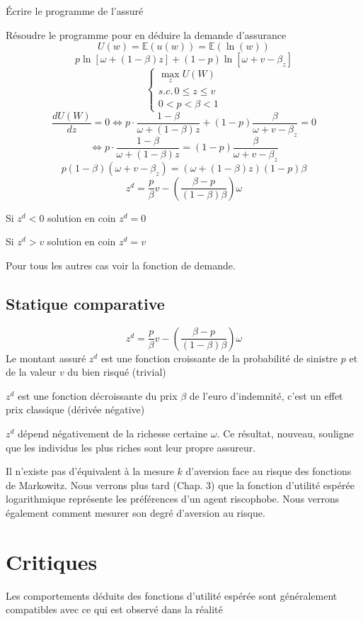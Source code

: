 \documentclass[a4paper, 12pt]{report}
\begin{document}
Écrire le programme de l'assuré

Résoudre le programme pour en déduire la demande
d'assurance
$$
U(w)=\mathbb{E}(u(w))=\mathbb{E}(\ln(w))
$$
$$
p\ln \left[ \omega + (1-\beta)z\right]+(1-p)\ln\left[ \omega + v - \beta_z \right] 
$$
$$
\begin{cases}\underset{z}\max U(W)\\ s.c. \, 0\le z\le v \\ 0 < p < \beta < 1 \end{cases}
$$
$$
\frac{dU(W)}{dz}=0 \Leftrightarrow p \cdot \frac{1-\beta}{\omega + (1-\beta)z}+(1-p)\frac{\beta}{\omega + v - \beta_z}=0
$$
$$
\Leftrightarrow  p \cdot \frac{1-\beta}{\omega + (1-\beta)z} = (1-p)\frac{\beta}{\omega + v - \beta_z}
$$
$$
p(1-\beta)(\omega + v - \beta_z) = (\omega +(1-\beta)z)(1-p)\beta
$$
$$
z^d = \frac{p}{\beta}v-\left( \frac{\beta-p}{(1-\beta)\beta} \right) \omega
$$

Si $z^d<0$ solution en coin $z^d=0$

Si $z^d>v$ solution en coin $z^d=v$

Pour tous les autres cas voir la fonction de demande.

\subsection{Statique comparative}
$$
z^d = \frac{p}{\beta}v-\left( \frac{\beta-p}{(1-\beta)\beta} \right) \omega
$$
Le montant assuré $z^d$ est une fonction croissante de la probabilité
de sinistre $p$ et de la valeur $v$ du bien risqué (trivial)

$z^d$ est une fonction décroissante du prix $\beta$ de l'euro d'indemnité,
c'est un effet prix classique (dérivée négative)

$z^d$ dépend négativement de la richesse certaine $\omega$. Ce résultat, nouveau, souligne que les individus les plus riches sont leur propre assureur.

Il n'existe pas d'équivalent à la mesure $k$ d'aversion face au risque des fonctions de Markowitz. Nous verrons plus tard (Chap. 3) que la fonction d'utilité espérée logarithmique représente les préférences d'un agent riscophobe. Nous verrons également comment mesurer son degré d'aversion au risque.

\section{Critiques}

Les comportements déduits des fonctions d'utilité espérée sont généralement compatibles avec ce qui est observé dans la réalité
\end{document}
